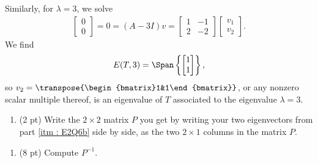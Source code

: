 {Similarly, for $\lambda = 3$, we solve
\begin{align*}
\begin{bmatrix}
0	\\
0
\end{bmatrix}
=
0
=
(A - 3 I) v
=
\begin{bmatrix}
1	&	-1	\\
2	&	-2
\end{bmatrix}
\begin{bmatrix}
v_{1}	\\
v_{2}
\end{bmatrix}%
.
\end{align*}
We find
\begin{align*}
E(T,3)
=
\Span\left\{
\begin{bmatrix}
1	\\
1
\end{bmatrix}
\right\},
\end{align*}
so $v_{2} = \transpose{\begin{bmatrix}1&1\end{bmatrix}}$, or any nonzero scalar multiple thereof, is an eigenvalue of $T$ associated to the eigenvalue $\lambda = 3$.}%



\begin{enumerate}[resume,label=(\alph*)]
\item\label{itm : E2Q6c} (2 pt) Write the $2 \times 2$ matrix $P$ you get by writing your two eigenvectors from part \ref{itm : E2Q6b} side by side, as the two $2 \times 1$ columns in the matrix $P$.
\end{enumerate}




\begin{enumerate}[resume,label=(\alph*)]
\item\label{itm : E2Q6d} (8 pt) Compute $P^{-1}$. 
\end{enumerate}

